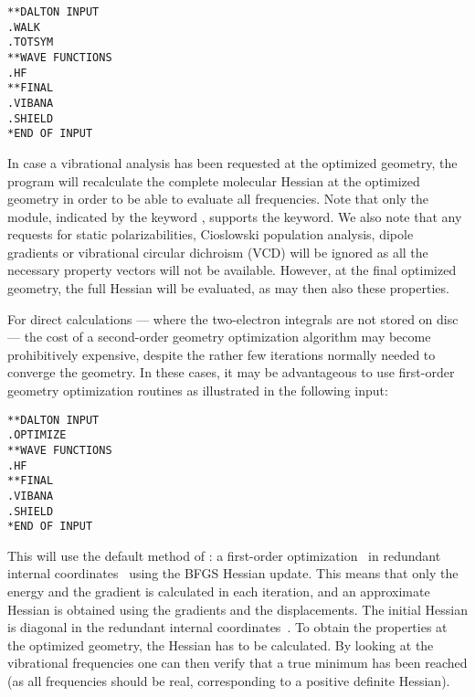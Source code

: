 \begin{verbatim}
**DALTON INPUT
.WALK
.TOTSYM
**WAVE FUNCTIONS
.HF
**FINAL
.VIBANA
.SHIELD
*END OF INPUT
\end{verbatim}

In case a vibrational analysis has been requested at the optimized
geometry, the program will recalculate the complete molecular Hessian
at the optimized geometry in order to be able to evaluate all
frequencies. Note that only the  module, indicated by the
keyword , supports the  keyword.
We also note that any requests for static
polarizabilities, Cioslowski population
analysis, dipole gradients or vibrational circular dichroism (VCD) will be ignored as all the necessary
property vectors will not be available. However, at the final
optimized geometry, the full Hessian will be evaluated, as may then
also these properties.

For direct calculations --- where the
two-electron integrals are not stored on disc --- the cost of a
second-order geometry optimization algorithm may become
prohibitively expensive, despite the rather few iterations normally
needed to converge the geometry. In these cases, it may be
advantageous to use first-order geometry
optimization routines as
illustrated in the following input:

\begin{verbatim}
**DALTON INPUT
.OPTIMIZE
**WAVE FUNCTIONS
.HF
**FINAL
.VIBANA
.SHIELD
*END OF INPUT
\end{verbatim}

This will use the default method of : a first-order
optimization~\cite{Fletcher} in redundant internal
coordinates~\cite{gfxfzpwtppjacs114,ppgfjcp96,vbth} using the BFGS Hessian update. This means that
only the energy and the gradient is calculated in each iteration, and
an approximate Hessian is obtained using the gradients and the
displacements. The initial Hessian is diagonal in the redundant
internal coordinates~\cite{rlabgkpamcpl241}.
To obtain the properties at the optimized 
geometry, the Hessian has to be calculated. By looking at the
vibrational frequencies one can then verify that a true minimum has
been reached (as all frequencies should be real, corresponding to a
positive definite Hessian).

